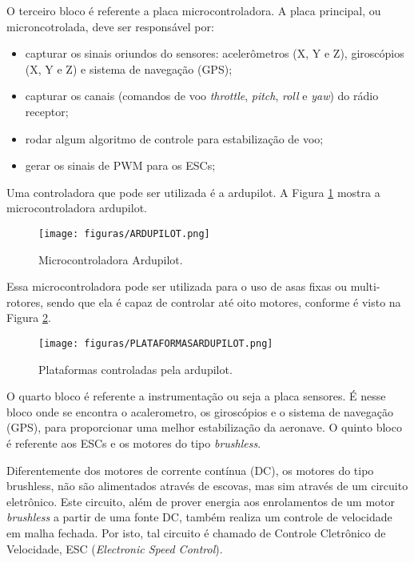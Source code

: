 O terceiro bloco é referente a placa microcontroladora. A placa principal, ou microncotrolada, deve ser responsável por:

\begin{itemize}
\item capturar os sinais oriundos do sensores: acelerômetros (X, Y e Z),  giroscópios (X, Y e Z) e sistema de navegação (GPS);
\item capturar os canais (comandos de voo \textit{throttle}, \textit{pitch}, \textit{roll} e \textit{yaw}) do rádio receptor;
\item rodar algum algoritmo de controle para estabilização de voo;
\item gerar os sinais de PWM para os ESCs;
\end{itemize}

Uma controladora que pode ser utilizada é a ardupilot. A Figura \ref{ARDUPILOT} mostra a microcontroladora ardupilot.

\begin{figure}
	\centering
	\texttt{[image: figuras/ARDUPILOT.png]}
    \caption{Microcontroladora Ardupilot.}
    \label{ARDUPILOT}
\end{figure}

Essa microcontroladora pode ser utilizada para o uso de asas fixas ou multi-rotores, sendo que ela é capaz de controlar até oito motores, conforme é visto na Figura \ref{PLATAFORMASARDUPILOT}.

\begin{figure}
	\centering
	\texttt{[image: figuras/PLATAFORMASARDUPILOT.png]}
    \caption{Plataformas controladas pela ardupilot.}
    \label{PLATAFORMASARDUPILOT}
\end{figure}

O quarto bloco é referente a instrumentação ou seja a placa sensores. É nesse bloco onde se encontra o acalerometro, os giroscópios e o sistema de navegação (GPS), para proporcionar uma melhor estabilização da aeronave. O quinto bloco é referente aos ESCs e os motores do tipo \textit{brushless}.

Diferentemente dos motores de corrente contínua (DC), os motores do tipo brushless, não são alimentados através de escovas, mas sim através de um circuito eletrônico. Este circuito, além de prover energia aos enrolamentos de um motor \textit{brushless} a partir de uma fonte DC, também realiza um controle de velocidade em malha fechada. Por isto, tal circuito é chamado de Controle Cletrônico de Velocidade, ESC (\textit{Electronic Speed Control}).

